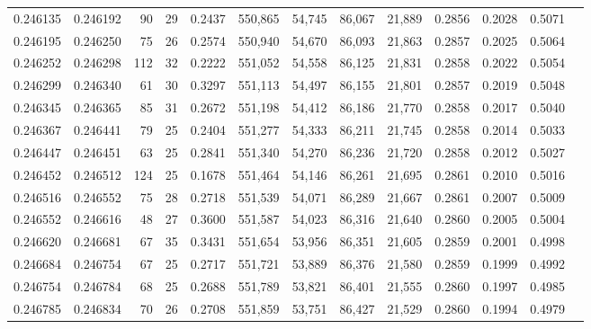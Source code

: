 \begin{tabular}{rrrrrrrrrrrrr}
0.246135 & 0.246192 &  90 &  29 &                                     0.2437 & 550,865 &  54,745 &  86,067 &  21,889 & 0.2856 & 0.2028 & 0.5071 \\
0.246195 & 0.246250 &  75 &  26 &                                     0.2574 & 550,940 &  54,670 &  86,093 &  21,863 & 0.2857 & 0.2025 & 0.5064 \\
0.246252 & 0.246298 & 112 &  32 &                                     0.2222 & 551,052 &  54,558 &  86,125 &  21,831 & 0.2858 & 0.2022 & 0.5054 \\
0.246299 & 0.246340 &  61 &  30 &                                     0.3297 & 551,113 &  54,497 &  86,155 &  21,801 & 0.2857 & 0.2019 & 0.5048 \\
0.246345 & 0.246365 &  85 &  31 &                                     0.2672 & 551,198 &  54,412 &  86,186 &  21,770 & 0.2858 & 0.2017 & 0.5040 \\
0.246367 & 0.246441 &  79 &  25 &                                     0.2404 & 551,277 &  54,333 &  86,211 &  21,745 & 0.2858 & 0.2014 & 0.5033 \\
0.246447 & 0.246451 &  63 &  25 &                                     0.2841 & 551,340 &  54,270 &  86,236 &  21,720 & 0.2858 & 0.2012 & 0.5027 \\
0.246452 & 0.246512 & 124 &  25 &                                     0.1678 & 551,464 &  54,146 &  86,261 &  21,695 & 0.2861 & 0.2010 & 0.5016 \\
0.246516 & 0.246552 &  75 &  28 &                                     0.2718 & 551,539 &  54,071 &  86,289 &  21,667 & 0.2861 & 0.2007 & 0.5009 \\
0.246552 & 0.246616 &  48 &  27 &                                     0.3600 & 551,587 &  54,023 &  86,316 &  21,640 & 0.2860 & 0.2005 & 0.5004 \\
0.246620 & 0.246681 &  67 &  35 &                                     0.3431 & 551,654 &  53,956 &  86,351 &  21,605 & 0.2859 & 0.2001 & 0.4998 \\
0.246684 & 0.246754 &  67 &  25 &                                     0.2717 & 551,721 &  53,889 &  86,376 &  21,580 & 0.2859 & 0.1999 & 0.4992 \\
0.246754 & 0.246784 &  68 &  25 &                                     0.2688 & 551,789 &  53,821 &  86,401 &  21,555 & 0.2860 & 0.1997 & 0.4985 \\
0.246785 & 0.246834 &  70 &  26 &                                     0.2708 & 551,859 &  53,751 &  86,427 &  21,529 & 0.2860 & 0.1994 & 0.4979 \\

\end{tabular}
